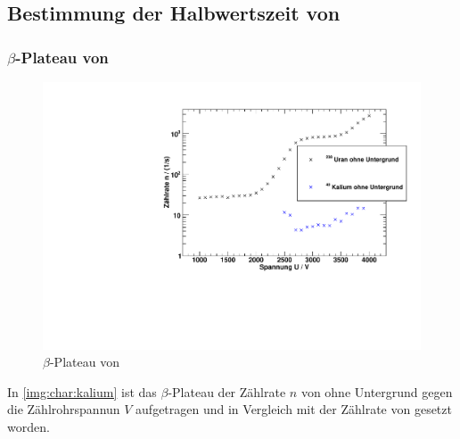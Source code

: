 
\subsection{Bestimmung der Halbwertszeit von \kalium}
\subsubsection{$\beta$-Plateau von \kalium}
\begin{figure}[H]
\begin{center}
  \includegraphics[width=15cm]{../img/Kalium40_Charakteristik.pdf}
  \caption[$\beta$-Plateau mit \samarium]{$\beta$-Plateau von \kalium}
  \label{img:char:kalium}
\end{center}
\end{figure}
In \autoref{img:char:kalium} ist das $\beta$-Plateau der Zählrate $n$ von \kalium ohne Untergrund gegen die Zählrohrspannun $V$ aufgetragen 
und in Vergleich mit der Zählrate von \uran gesetzt worden.

